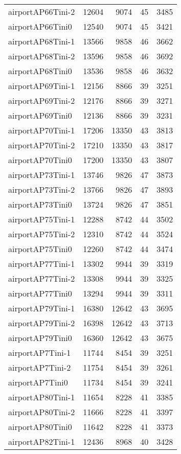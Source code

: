 \begin{longtable}{lrrrr}
airportAP66Tini-2 & 12604 & 9074 & 45 & 3485 \\
airportAP66Tini0 & 12540 & 9074 & 45 & 3421 \\
airportAP68Tini-1 & 13566 & 9858 & 46 & 3662 \\
airportAP68Tini-2 & 13596 & 9858 & 46 & 3692 \\
airportAP68Tini0 & 13536 & 9858 & 46 & 3632 \\
airportAP69Tini-1 & 12156 & 8866 & 39 & 3251 \\
airportAP69Tini-2 & 12176 & 8866 & 39 & 3271 \\
airportAP69Tini0 & 12136 & 8866 & 39 & 3231 \\
airportAP70Tini-1 & 17206 & 13350 & 43 & 3813 \\
airportAP70Tini-2 & 17210 & 13350 & 43 & 3817 \\
airportAP70Tini0 & 17200 & 13350 & 43 & 3807 \\
airportAP73Tini-1 & 13746 & 9826 & 47 & 3873 \\
airportAP73Tini-2 & 13766 & 9826 & 47 & 3893 \\
airportAP73Tini0 & 13724 & 9826 & 47 & 3851 \\
airportAP75Tini-1 & 12288 & 8742 & 44 & 3502 \\
airportAP75Tini-2 & 12310 & 8742 & 44 & 3524 \\
airportAP75Tini0 & 12260 & 8742 & 44 & 3474 \\
airportAP77Tini-1 & 13302 & 9944 & 39 & 3319 \\
airportAP77Tini-2 & 13308 & 9944 & 39 & 3325 \\
airportAP77Tini0 & 13294 & 9944 & 39 & 3311 \\
airportAP79Tini-1 & 16380 & 12642 & 43 & 3695 \\
airportAP79Tini-2 & 16398 & 12642 & 43 & 3713 \\
airportAP79Tini0 & 16360 & 12642 & 43 & 3675 \\
airportAP7Tini-1 & 11744 & 8454 & 39 & 3251 \\
airportAP7Tini-2 & 11754 & 8454 & 39 & 3261 \\
airportAP7Tini0 & 11734 & 8454 & 39 & 3241 \\
airportAP80Tini-1 & 11654 & 8228 & 41 & 3385 \\
airportAP80Tini-2 & 11666 & 8228 & 41 & 3397 \\
airportAP80Tini0 & 11642 & 8228 & 41 & 3373 \\
airportAP82Tini-1 & 12436 & 8968 & 40 & 3428 \\

\end{longtable}
